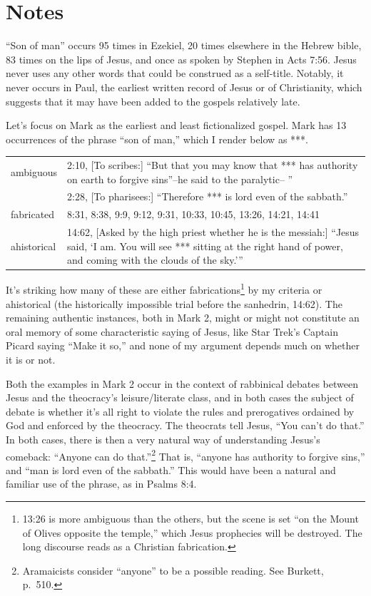 \documentclass[10pt,twoside]{article} %
\newcommand{\quotesize}{\normalsize{}}
\newcommand{\maintextquotesize}{\renewcommand{\quotesize}{\large{}}}
\newcommand{\notequotesize}{\renewcommand{\quotesize}{\normalsize{}}}
\DeclareRobustCommand{\stixdangerousbend}{%
  {\usefont{U}{stixbbit}{m}{it}\symbol{"F6}}%
}
\newcommand{\dangerousbend}{\rotatebox[origin=c]{-10}{\stixdangerousbend}}
\newcommand{\link}[2]{\protect\jumplink{anchor-#1}{\textcolor{blue}{#2}}} %
\newcommand{\notewithoutbackref}[1]{\link{note-#1}{\dangerousbend\pageref{note:#1}}}
\newenvironment{notesection}[1]{
  \setcounter{secnumdepth}{0}          %
  \section*{#1}
  \setcounter{secnumdepth}{2}          %
  \notequotesize
}%
{
  \maintextquotesize
}
\begin{document}
\begin{notesection}{Notes}
``Son of man'' occurs 95 times in Ezekiel, 20 times elsewhere in the Hebrew bible, 83 times
on the lips of Jesus, and once as spoken by Stephen in Acts 7:56. Jesus never uses any other words that could be construed as a self-title.
Notably, it never occurs in Paul, the earliest
written record of Jesus or of Christianity, which suggests that it may have been added to the gospels relatively late.


Let's focus on Mark  as the earliest and least fictionalized gospel.
Mark has 13 occurrences of the phrase ``son of man,'' which I render below as ***.

\begin{tabular}{lp{70mm}}
ambiguous & 2:10, [To scribes:] ``But that you may know that *** has authority on earth to forgive sins''--he said to the paralytic-- '' \\
          & 2:28, [To pharisees:] ``Therefore *** is lord even of the sabbath.'' \\
fabricated & 8:31, 8:38, 9:9, 9:12, 9:31, 10:33, 10:45, 13:26, 14:21, 14:41 \\
ahistorical & 14:62, [Asked by the high priest whether he is the messiah:]
                 ``Jesus said, `I am. You will see *** sitting at the right hand of power, and coming with the clouds of the sky.'{}''
\end{tabular}

It's striking how many of these are either fabrications\footnote{13:26 is more ambiguous than the others, but the scene is set
``on the Mount of Olives opposite the temple,'' which Jesus prophecies will be destroyed. The long discourse reads as a Christian
fabrication.} by my criteria \notewithoutbackref{about-this-doc}
or ahistorical (the historically impossible trial before the sanhedrin, 14:62).
The remaining authentic instances, both in Mark 2, might or might not constitute an oral memory
of some characteristic saying of Jesus, like Star Trek's Captain Picard saying ``Make it so,''
and none of my argument depends much on whether it is or not.

Both the examples in Mark 2 occur in the context of rabbinical debates between
Jesus and the theocracy's leisure/literate class, and in both cases the subject of debate is whether it's all
right to violate the rules and prerogatives ordained by God and enforced by the theocracy.
The theocrats tell Jesus, ``You can't do that.''
In both cases, there is then a very natural way of understanding Jesus's comeback: ``Anyone can do that.''\footnote{Aramaicists consider
``anyone'' to be a possible reading. See Burkett, p.~510.}
That is, ``anyone has authority to forgive sins,'' and ``man is lord even of the sabbath.'' This would have been a natural
and familiar use of the phrase, as in Psalms 8:4.


\end{notesection}
\end{document}
